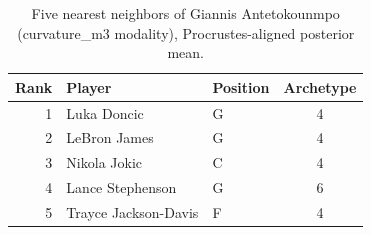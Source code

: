 \begin{table}[htbp]
  \centering\small
  \begin{tabular}{rllc}
    \toprule
    Rank & Player & Position & Archetype \\
    \midrule
    1 & Luka Doncic & G & 4 \\
    2 & LeBron James & G & 4 \\
    3 & Nikola Jokic & C & 4 \\
    4 & Lance Stephenson & G & 6 \\
    5 & Trayce Jackson-Davis & F & 4 \\
    \bottomrule
  \end{tabular}
  \caption{Five nearest neighbors of Giannis Antetokounmpo (curvature_m3 modality), Procrustes-aligned posterior mean.}
  \label{tab:Giannis_Antetokounmpo_neighbors_curvature_m3}
\end{table}

